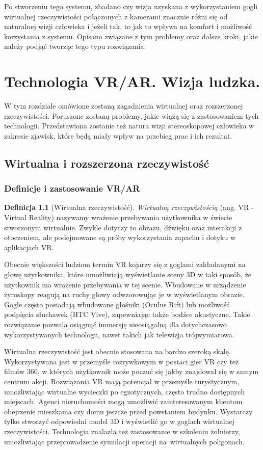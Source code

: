 \documentclass[a4paper,11pt,twoside]{report}
\theoremstyle{definition}
\newtheorem{definition}[theorem]{Definicja}
\begin{document}
Po stworzeniu tego systemu, zbadano czy wizja uzyskana z wykorzystaniem gogli wirtualnej rzeczywistości połączonych z kamerami znacznie różni się od naturalnej wizji człowieka i jeżeli tak, to jak to wpływa na komfort i możliwość korzystania z systemu. Opisano związane z tym problemy oraz dalsze kroki, jakie należy podjąć tworząc tego typu rozwiązania.

\chapter{Technologia VR/AR. Wizja ludzka.}

W tym rozdziale omówione zostaną zagadnienia wirtualnej oraz rozszerzonej rzeczywistości. Poruszone zostaną problemy, jakie wiążą się z zastosowaniem tych technologii. Przedstawiona zostanie też natura wizji stereoskopowej człowieka w zakresie zjawisk, które będą miały wpływ na przebieg prac i ich rezultat.

\section{Wirtualna i rozszerzona rzeczywistość}

\subsection{Definicje i zastosowanie VR/AR}

\begin{definition}[Wirtualna rzeczywistość]
\textit{Wirtualną rzeczywistością} (ang. VR - Virtual Reality) nazywamy wrażenie przebywania użytkownika w świecie stworzonym wirtualnie. Zwykle dotyczy to obrazu, dźwięku oraz interakcji z otoczeniem, ale podejmowane są próby wykorzystania zapachu i dotyku w aplikacjach VR.
\end{definition}

Obecnie większości ludziom termin VR kojarzy się z goglami zakładanymi na głowę użytkownika, które umożliwiają wyświetlanie sceny 3D w taki sposób, że użytkownik ma wrażenie przebywania w tej scenie. Wbudowane w urządzenie żyroskopy reagują na ruchy głowy odwzorowując je w wyświetlanym obrazie. Gogle często posiadają wbudowane głośniki (Oculus Rift) lub możliwość podpięcia słuchawek (HTC Vive), zapewniając także bodźce akustyczne. Takie rozwiązanie pozwala osiągnąć immersję nieosiągalną dla dotychczasowo wykorzystywanych technologii, nawet takich jak telewizja trójwymiarowa.

Wirtualna rzeczywistość jest obecnie stosowana na bardzo szeroką skalę. Wykorzystywana jest w przemyśle rozrywkowym w postaci gier VR czy też filmów 360\textdegree, w których użytkownik może poczuć się jakby znajdował się w samym centrum akcji. Rozwiązania VR mają potencjał w przemyśle turystycznym, umożliwiając wirtualne wycieczki po egzotycznych, często trudno dostępnych miejscach. Agenci nieruchomości mogą umożliwić zainteresowanym klientom obejrzenie mieszkania czy domu jeszcze przed powstaniem budynku. Wystarczy tylko stworzyć odpowiedni model 3D i wyświetlić go w goglach wirtualnej rzeczywistości. Technologia znalazła też zastosowanie w szkoleniu żołnierzy, umożliwiając przeprowadzenie symulacji operacji na~wirtualnych poligonach.\cite{VRdefinition}
\end{document}
